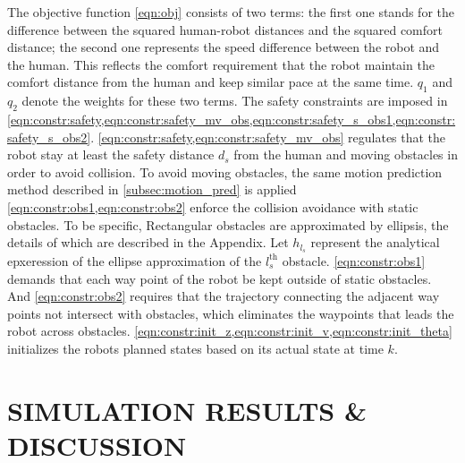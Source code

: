 \documentclass[letterpaper, 10 pt, conference]{ieeeconf}
\begin{document}
	The objective function \cref{eqn:obj} consists of two terms: the first one stands for the difference between the squared human-robot distances and the squared comfort distance; the second one represents the speed difference between the robot and the human.
	This reflects the comfort requirement that the robot maintain the comfort distance from the human and keep similar pace at the same time.
	$q_1$ and $q_2$ denote the weights for these two terms.
	The safety constraints are imposed in \cref{eqn:constr:safety,eqn:constr:safety_mv_obs,eqn:constr:safety_s_obs1,eqn:constr:safety_s_obs2}.
	\cref{eqn:constr:safety,eqn:constr:safety_mv_obs} regulates that the robot stay at least the safety distance $d_s$ from the human and moving obstacles in order to avoid collision.
	To avoid moving obstacles, the same motion prediction method described in \cref{subsec:motion_pred} is applied
	\cref{eqn:constr:obs1,eqn:constr:obs2} enforce the collision avoidance with static obstacles.
	To be specific, Rectangular obstacles are approximated by ellipsis, the details of which are described in the Appendix.
	Let $h_{l_s}$ represent the analytical epxeression of the ellipse approximation of the $l_s^\text{th}$ obstacle.
	\cref{eqn:constr:obs1} demands that each way point of the robot be kept outside of static obstacles.
	And \cref{eqn:constr:obs2} requires that the trajectory connecting the adjacent way points not intersect with obstacles, which eliminates the waypoints that leads the robot across obstacles.
	\cref{eqn:constr:init_z,eqn:constr:init_v,eqn:constr:init_theta} initializes the robots planned states based on its actual state at time $k$.
	
	
	\section{SIMULATION RESULTS \& DISCUSSION}\label{sec:results}
\end{document}
